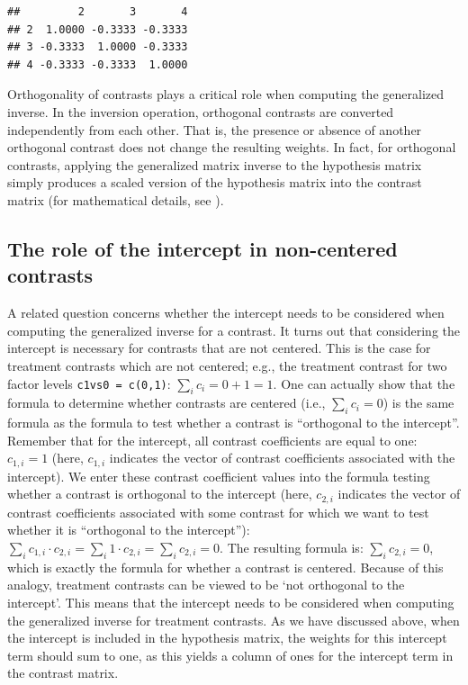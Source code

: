 \documentclass[
  12pt,
]{krantz}
\theoremstyle{definition}
\theoremstyle{definition}
\theoremstyle{definition}
\theoremstyle{definition}
\theoremstyle{remark}
\begin{document}
\begin{verbatim}
##         2       3       4
## 2  1.0000 -0.3333 -0.3333
## 3 -0.3333  1.0000 -0.3333
## 4 -0.3333 -0.3333  1.0000
\end{verbatim}

Orthogonality of contrasts plays a critical role when computing the generalized inverse. In the inversion operation, orthogonal contrasts are converted independently from each other. That is, the presence or absence of another orthogonal contrast does not change the resulting weights. In fact, for orthogonal contrasts, applying the generalized matrix inverse to the hypothesis matrix simply produces a scaled version of the hypothesis matrix into the contrast matrix (for mathematical details, see \citet{schad2020capitalize}).

\hypertarget{the-role-of-the-intercept-in-non-centered-contrasts}{%
\subsection{The role of the intercept in non-centered contrasts}\label{the-role-of-the-intercept-in-non-centered-contrasts}}

A related question concerns whether the intercept needs to be considered when computing the generalized inverse for a contrast. It turns out that considering the intercept is necessary for contrasts that are not centered. This is the case for treatment contrasts which are not centered; e.g., the treatment contrast for two factor levels \texttt{c1vs0\ =\ c(0,1)}: \(\sum_i c_i = 0 + 1 = 1\). One can actually show that the formula to determine whether contrasts are centered (i.e., \(\sum_i c_i = 0\)) is the same formula as the formula to test whether a contrast is ``orthogonal to the intercept''. Remember that for the intercept, all contrast coefficients are equal to one: \(c_{1,i} = 1\) (here, \(c_{1,i}\) indicates the vector of contrast coefficients associated with the intercept). We enter these contrast coefficient values into the formula testing whether a contrast is orthogonal to the intercept (here, \(c_{2,i}\) indicates the vector of contrast coefficients associated with some contrast for which we want to test whether it is ``orthogonal to the intercept''): \(\sum_i c_{1,i} \cdot c_{2,i} = \sum_i 1 \cdot c_{2,i} = \sum_i c_{2,i} = 0\). The resulting formula is: \(\sum_i c_{2,i} = 0\), which is exactly the formula for whether a contrast is centered. Because of this analogy, treatment contrasts can be viewed to be `not orthogonal to the intercept'. This means that the intercept needs to be considered when computing the generalized inverse for treatment contrasts. As we have discussed above, when the intercept is included in the hypothesis matrix, the weights for this intercept term should sum to one, as this yields a column of ones for the intercept term in the contrast matrix.
\end{document}
